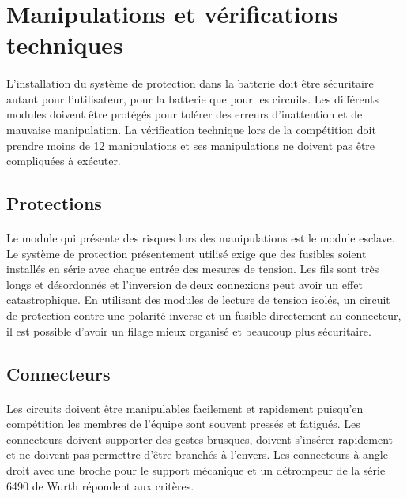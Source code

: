 \section{Manipulations et vérifications techniques}
\paragraph*{}
L'installation du système de protection dans la batterie doit être sécuritaire autant pour l'utilisateur, pour la batterie que pour les circuits. Les différents modules doivent être protégés pour tolérer des erreurs d'inattention et de mauvaise manipulation. La vérification technique lors de la compétition doit prendre moins de 12 manipulations et ses manipulations ne doivent pas être compliquées à exécuter.

	\subsection{Protections}
	\paragraph*{}
	Le module qui présente des risques lors des manipulations est le module esclave. Le système de protection présentement utilisé exige que des fusibles soient installés en série avec chaque entrée des mesures de tension. Les fils sont très longs et désordonnés et l'inversion de deux connexions peut avoir un effet catastrophique. En utilisant des modules de lecture de tension isolés, un circuit de protection contre une polarité inverse et un fusible directement au connecteur, il est possible d'avoir un filage mieux organisé et beaucoup plus sécuritaire. 
	
	\subsection{Connecteurs}
	\paragraph*{}
	Les circuits doivent être manipulables facilement et rapidement puisqu'en compétition les membres de l'équipe sont souvent pressés et fatigués. Les connecteurs doivent supporter des gestes brusques, doivent s'insérer rapidement et ne doivent pas permettre d'être branchés à l'envers. Les connecteurs à angle droit avec une broche pour le support mécanique et un détrompeur de la série 6490 de Wurth répondent aux critères. 
	
